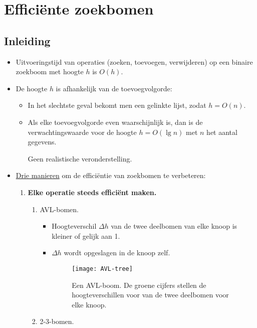 \chapter{Efficiënte zoekbomen}

\section{Inleiding}
\begin{itemize}
    \item Uitvoeringstijd van operaties (zoeken, toevoegen, verwijderen) op een binaire zoekboom met hoogte $h$ is $O(h)$.
    \item De hoogte $h$ is afhankelijk van de toevoegvolgorde:
    \begin{itemize}
        \item In het slechtste geval bekomt men een gelinkte lijst, zodat $h = O(n)$.
        \item Als elke toevoegvolgorde even waarschijnlijk is, dan is de verwachtingswaarde voor de hoogte $h = O(\lg n)$ met $n$ het aantal gegevens.
        \begin{itemize}
            \alert Geen realistische veronderstelling.
        \end{itemize}
    \end{itemize}
    \item \underline{Drie manieren} om de efficiëntie van zoekbomen te verbeteren:
    \begin{enumerate}
        \item \textbf{Elke operatie steeds efficiënt maken.}
        \begin{enumerate}
            \item AVL-bomen.
            \begin{itemize}
                \item Hoogteverschil $\Delta h$ van de twee deelbomen van elke knoop is kleiner of gelijk aan 1.
                \item $\Delta h$ wordt opgeslagen in de knoop zelf.
                \begin{figure}[ht]
                    \centering
                    \texttt{[image: AVL-tree]}
                    \caption{Een AVL-boom. De groene cijfers stellen de hoogteverschillen voor van de twee deelbomen voor elke knoop.}
                    \label{fig:AVL-tree}
                \end{figure}
            \end{itemize}
            \item 2-3-bomen.

\end{enumerate}
\end{enumerate}
\end{itemize}
